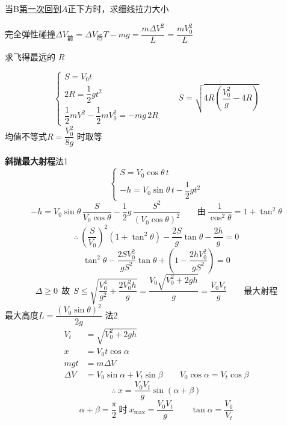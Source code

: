 \begin{problem}
当B\underline{第一次回到$A$}正下方时，求细线拉力大小
\begin{solution}
完全弹性碰撞\qquad $\Delta V_{\text{前}}=\Delta V_{\text{后}}$\qquad $T-mg=\dfrac{m\Delta V^2}{L}=\dfrac{mV_0^2}{L}$
\end{solution}
\end{problem}
\begin{problem}
求飞得最远的 $R$
\begin{solution}
\[ \begin{cases} S=V_0t\\ 2R=\dfrac12gt^2\\ \dfrac12mV^2-\dfrac12mV_0^2=-mg\,2R\end{cases}\qquad S=\sqrt{4R\left(\dfrac{V_0^2}{g}-4R\right)} \]
均值不等式\quad $R=\dfrac{V_0^2}{8g}$ 时取等
\end{solution}
\end{problem}
\noindent \textbf{斜抛最大射程}\qquad 法1
\[ \begin{cases} S=V_0\cos\theta\,t\\ -h=V_0\sin\theta\,t-\dfrac12gt^2\end{cases} \]
\[ -h=V_0\sin\theta\,\frac{S}{V_0\cos\theta}-\frac12g\,\frac{S^2}{(V_0\cos\theta)^2}\qquad\text{由}\ \frac{1}{\cos^2\theta}=1+\tan^2\theta \]
\[ \therefore\ \left(\frac{S}{V_0}\right)^2(1+\tan^2\theta)-\frac{2S}{g}\tan\theta-\frac{2h}{g}=0 \]
\[ \tan^2\theta-\frac{2SV_0^2}{gS^2}\tan\theta+\left(1-\frac{2hV_0^2}{gS^2}\right)=0 \]
\[ \Delta\ge0\ \ \text{故}\ \ S\le\sqrt{\frac{V_0^4}{g^2}+\frac{2V_0^2h}{g}}=\frac{V_0\sqrt{V_0^2+2gh}}{g}=\frac{V_0V_t}{g}\qquad\text{最大射程} \]
\noindent 最大高度\quad $L=\dfrac{(V_0\sin\theta)^2}{2g}$
\noindent 法2
\begin{align*}
V_t&=\sqrt{V_0^2+2gh}\\
x&=V_0t\cos\alpha\\
mgt&=m\Delta V\\
\Delta V&=V_0\sin\alpha+V_t\sin\beta\qquad V_0\cos\alpha=V_t\cos\beta
\end{align*}
\[ \therefore\ x=\frac{V_0V_t}{g}\sin(\alpha+\beta) \]
\[ \alpha+\beta=\frac{\pi}{2}\ \text{时}\ x_{\max}=\frac{V_0V_t}{g}\qquad \tan\alpha=\frac{V_0}{V_t} \]

